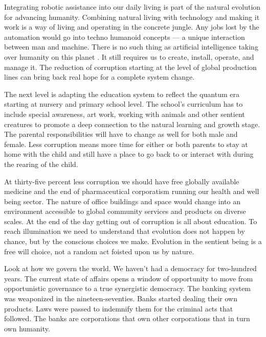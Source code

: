 Integrating robotic assistance into our daily living is part of the
natural evolution for advancing humanity. Combining natural living with
technology and making it work is a way of living and operating in the
concrete jungle. Any jobs lost by the automation would go into techno
humanoid concepts --- a unique interaction between man and machine.
There is no such thing as artificial intelligence taking over humanity
on this planet . It still requires us to create, install, operate, and
manage it. The reduction of corruption starting at the level of global
production lines can bring back real hope for a complete system change.

The next level is adapting the education system to reflect the quantum
era starting at nursery and primary school level. The school's
curriculum has to include special awareness, art work, working with
animals and other sentient creatures to promote a deep connection to the
natural learning and growth stage. The parental responsibilities will
have to change as well for both male and female. Less corruption means
more time for either or both parents to stay at home with the child and
still have a place to go back to or interact with during the rearing of
the child.

At thirty-five percent less corruption we should have free globally
available medicine and the end of pharmaceutical corporatism running our
health and well being sector. The nature of office buildings and space
would change into an environment accessible to global community services
and products on diverse scales. At the end of the day getting out of
corruption is all about education. To reach illumination we need to
understand that evolution does not happen by chance, but by the
conscious choices we make. Evolution in the sentient being is a free
will choice, not a random act foisted upon us by nature.

Look at how we govern the world. We haven't had a democracy for
two-hundred years. The current state of affairs opens a window of
opportunity to move from opportunistic governance to a true synergistic
democracy. The banking system was weaponized in the nineteen-seventies.
Banks started dealing their own products. Laws were passed to indemnify
them for the criminal acts that followed. The banks are corporations
that own other corporations that in turn own humanity.

